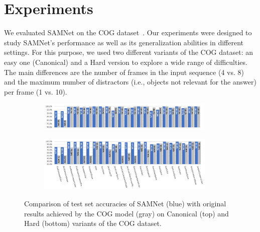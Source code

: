 \section{Experiments}

We evaluated SAMNet on the COG dataset~\cite{yang2018dataset}.
Our experiments were designed to study SAMNet's performance as well as its generalization abilities in different settings.
For this purpose, we used two different variants of the COG dataset: an easy one (Canonical) and a Hard version to explore a wide range of difficulties.
The main differences are the number of frames in the input sequence (4 vs. 8) and the maximum number of distractors (i.e., objects not relevant for the answer) per frame (1 vs. 10).


%
%


\begin{figure}[htbp]
	\centering
  \begin{subfigure}{\textwidth}
    \includegraphics[width=0.92\textwidth]{../results/samnet_cog_orig_canonical_no_labels.png}
  \end{subfigure}%
  \newline
  \begin{subfigure}{\textwidth}
	\includegraphics[width=0.93\textwidth]{../results/samnet_cog_orig_hard.png}
  \end{subfigure}%
\caption{Comparison of test set accuracies of SAMNet (blue) with original results achieved by the COG model (gray) on Canonical (top) and Hard (bottom) variants of the COG dataset.}
\label{fig:samnet_cog_detailed}
\end{figure}


